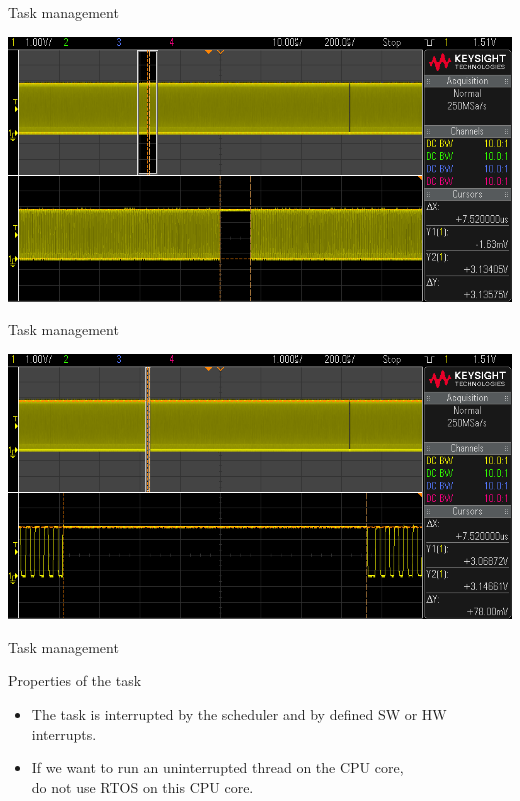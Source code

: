 \documentclass[
aspectratio=169,
]{beamer}
\begin{document}
\begin{frame}{Task management}
	\begin{center}
		\includegraphics[width=.9\textwidth]{img/scope_4d.png}
	\end{center}
\end{frame}

\begin{frame}{Task management}
	\begin{center}
		\includegraphics[width=.9\textwidth]{img/scope_4e.png}
	\end{center}
\end{frame}

\begin{frame}{Task management}
	\begin{block}{Properties of the task}
		\begin{itemize}
			\item The task is interrupted by the scheduler and by defined SW or HW interrupts.
			\item If we want to run an uninterrupted thread on the CPU core,\\do not use RTOS on this CPU core.
		\end{itemize}
	\end{block}
\end{frame}
\end{document}
